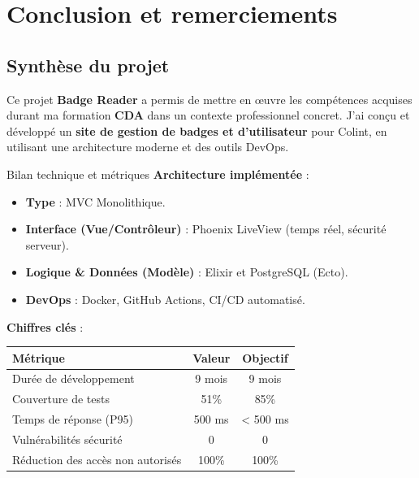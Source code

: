 \chapter{Conclusion et remerciements}

\section{Synthèse du projet}
Ce projet \textbf{Badge Reader} a permis de mettre en œuvre les compétences acquises durant ma formation \textbf{CDA} dans un contexte professionnel concret.
J’ai conçu et développé un \textbf{site de gestion de badges et d'utilisateur} pour Colint, en utilisant une architecture moderne et des outils DevOps.
\newline

\begin{for_you}{Bilan technique et métriques}
    \textbf{Architecture implémentée} :
    \begin{itemize}
        \item \textbf{Type} : MVC Monolithique.
        \item \textbf{Interface (Vue/Contrôleur)} : Phoenix LiveView (temps réel, sécurité serveur).
        \item \textbf{Logique \& Données (Modèle)} : Elixir et PostgreSQL (Ecto).
        \item \textbf{DevOps} : Docker, GitHub Actions, CI/CD automatisé.
        \newline
    \end{itemize}

    \textbf{Chiffres clés} :
    \begin{center}
    \begin{tabular}{|l|c|c|}
    \hline
    \textbf{Métrique}               & \textbf{Valeur} & \textbf{Objectif} \\
    \hline
    Durée de développement           & 9 mois          & 9 mois          \\
    Couverture de tests             & 51\%            & 85\%            \\
    Temps de réponse (P95)          & 500 ms          & < 500 ms        \\
    Vulnérabilités sécurité         & 0               & 0               \\
    Réduction des accès non autorisés & 100\%          & 100\%           \\
    \hline
    \end{tabular}
    \end{center}


\end{for_you}
